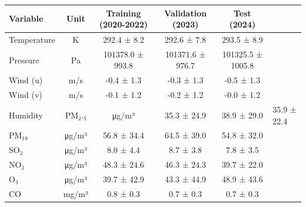 \begin{tabular}{l|c|c|c|c}
\toprule
Variable & Unit & Training (2020-2022) & Validation (2023) & Test (2024) \\
\midrule
Temperature & K & 292.4 ± 8.2 & 292.6 ± 7.8 & 293.5 ± 8.9 \\
Pressure & Pa & 101378.0 ± 993.8 & 101371.6 ± 976.7 & 101325.5 ± 1005.8 \\
Wind (u) & m/s & -0.4 ± 1.3 & -0.3 ± 1.3 & -0.5 ± 1.3 \\
Wind (v) & m/s & -0.1 ± 1.2 & -0.2 ± 1.2 & -0.0 ± 1.2 \\
Humidity & %
PM₂.₅ & μg/m³ & 35.3 ± 24.9 & 38.9 ± 29.0 & 35.9 ± 22.4 \\
PM₁₀ & μg/m³ & 56.8 ± 34.4 & 64.5 ± 39.0 & 54.8 ± 32.0 \\
SO₂ & μg/m³ & 8.0 ± 4.4 & 8.7 ± 3.8 & 7.8 ± 3.5 \\
NO₂ & μg/m³ & 48.3 ± 24.6 & 46.3 ± 24.3 & 39.7 ± 22.0 \\
O₃ & μg/m³ & 39.7 ± 42.9 & 43.3 ± 44.9 & 48.9 ± 43.6 \\
CO & mg/m³ & 0.8 ± 0.3 & 0.7 ± 0.3 & 0.7 ± 0.3 \\
\bottomrule
\end{tabular}

